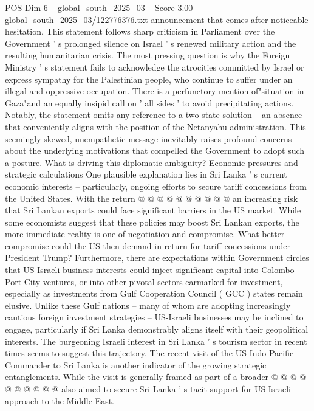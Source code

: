 \begin{textsample}{POS Dim 6 – global\_south\_2025\_03 – Score 3.00 – global\_south\_2025\_03/122776376.txt}  \label{ex:f6_pos_320}
announcement that comes after noticeable hesitation.
This statement follows sharp criticism in Parliament over the Government ' s prolonged silence on Israel ' s renewed military action and the resulting humanitarian crisis.
The most pressing question is why the Foreign Ministry ' s statement fails to acknowledge the atrocities committed by Israel or express sympathy for the Palestinian people, who continue to suffer under an illegal and oppressive occupation.
There is a perfunctory mention of"situation in Gaza"and an equally insipid call on ' all sides ' to avoid precipitating actions.
Notably, the statement omits any reference to a two-state solution -- an absence that conveniently aligns with the position of the Netanyahu administration.
This seemingly skewed, unempathetic message inevitably raises profound concerns about the underlying motivations that compelled the Government to adopt such a posture.
What is driving this diplomatic ambiguity?
Economic pressures and strategic calculations One plausible explanation lies in Sri Lanka ' s current economic interests -- particularly, ongoing efforts to secure tariff concessions from the United States.
With the return @ @ @ @ @ @ @ @ @ @ an increasing risk that Sri Lankan exports could face significant barriers in the US market.
While some economists suggest that these policies may boost Sri Lankan exports, the more immediate reality is one of negotiation and compromise.
What better compromise could the US then demand in return for tariff concessions under President Trump?
Furthermore, there are expectations within Government circles that US-Israeli business interests could inject significant capital into Colombo Port City ventures, or into other pivotal sectors earmarked for investment, especially as investments from Gulf Cooperation Council ( GCC ) states remain elusive.
Unlike these Gulf nations -- many of whom are adopting increasingly cautious foreign investment strategies -- US-Israeli businesses may be inclined to engage, particularly if Sri Lanka demonstrably aligns itself with their geopolitical interests.
The burgeoning Israeli interest in Sri Lanka ' s tourism sector in recent times seems to suggest this trajectory.
The recent visit of the US Indo-Pacific Commander to Sri Lanka is another indicator of the growing strategic entanglements.
While the visit is generally framed as part of a broader @ @ @ @ @ @ @ @ @ @ also aimed to secure Sri Lanka ' s tacit support for US-Israeli approach to the Middle East.

\end{textsample}
